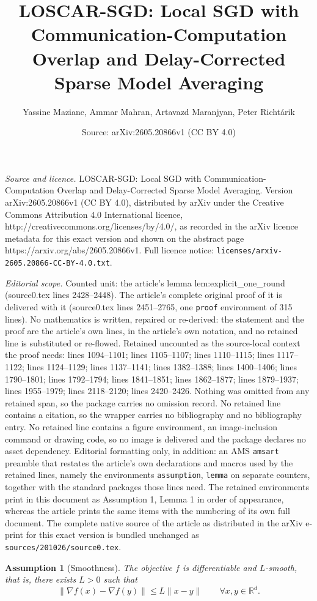 \documentclass[10pt,a4paper]{amsart}
\title{LOSCAR-SGD: Local SGD with Communication-Computation Overlap and Delay-Corrected Sparse Model Averaging}
\author{Yassine Maziane, Ammar Mahran, Artavazd Maranjyan, Peter Richt\'arik}
\date{Source: arXiv:2605.20866v1 (CC BY 4.0)}
\newtheorem{assumption}{Assumption}
\newcommand{\R}{\mathbb{R}}  %
\begin{document}
\maketitle

\noindent\emph{Source and licence.} LOSCAR-SGD: Local SGD with Communication-Computation Overlap and Delay-Corrected Sparse Model Averaging. Version arXiv:2605.20866v1 (CC BY 4.0), distributed by arXiv under the Creative Commons Attribution 4.0 International licence, http://creativecommons.org/licenses/by/4.0/, as recorded in the arXiv licence metadata for this exact version and shown on the abstract page https://arxiv.org/abs/2605.20866v1. Full licence notice: \texttt{licenses/arxiv-2605.20866-CC-BY-4.0.txt}.\par\smallskip

\noindent\textit{Editorial scope.} Counted unit: the article's lemma lem:explicit\_one\_round (source0.tex lines 2428--2448). The article's complete original proof of it is delivered with it (source0.tex lines 2451--2765, one \texttt{proof} environment of 315 lines). No mathematics is written, repaired or re-derived: the statement and the proof are the article's own lines, in the article's own notation, and no retained line is substituted or re-flowed.  Retained uncounted as the source-local context the proof needs: lines 1094--1101; lines 1105--1107; lines 1110--1115; lines 1117--1122; lines 1124--1129; lines 1137--1141; lines 1382--1388; lines 1400--1406; lines 1790--1801; lines 1792--1794; lines 1841--1851; lines 1862--1877; lines 1879--1937; lines 1955--1979; lines 2118--2120; lines 2420--2426.  Nothing was omitted from any retained span, so the package carries no omission record.  No retained line contains a citation, so the wrapper carries no bibliography and no bibliography entry.  No retained line contains a figure environment, an image-inclusion command or drawing code, so no image is delivered and the package declares no asset dependency.  Editorial formatting only, in addition: an AMS \texttt{amsart} preamble that restates the article's own declarations and macros used by the retained lines, namely the environments \texttt{assumption}, \texttt{lemma} on separate counters, together with the standard packages those lines need.  The retained environments print in this document as Assumption 1, Lemma 1 in order of appearance, whereas the article prints the same items with the numbering of its own full document.  The complete native source of the article as distributed in the arXiv e-print for this exact version is bundled unchanged as \texttt{sources/201026/source0.tex}.
\begin{assumption}[Smoothness]\label{ass:smoothness}
    The objective $f$ is differentiable and $L$-smooth, that is,
    there exists $L>0$ such that
    \[%
        \|\nabla f(x)-\nabla f(y)\| \leq L\|x-y\|
        \qquad \forall x,y \in \R^d.
    \]
\end{assumption}
\end{document}
